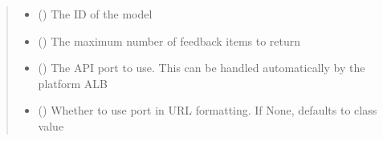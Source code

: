 \documentclass[letterpaper,10pt,english]{sphinxmanual}
\begin{document}
\begin{fulllineitems}
\begin{fulllineitems}
\begin{sphinxVerbatim}[commandchars=\\\{\}]
 
  
\end{sphinxVerbatim}
\begin{quote}\begin{description}
\begin{itemize}
\item {} 
\sphinxAtStartPar
{} () \textendash{} The ID of the model

\item {} 
\sphinxAtStartPar
{} (\sphinxstyleliteralemphasis{\sphinxupquote{ (}}\sphinxstyleliteralemphasis{\sphinxupquote{)}}) \textendash{} The maximum number of feedback items to return

\item {} 
\sphinxAtStartPar
{} (\sphinxstyleliteralemphasis{\sphinxupquote{ (}}\sphinxstyleliteralemphasis{\sphinxupquote{)}}) \textendash{} The API port to use. This can be handled automatically by the platform ALB

\item {} 
\sphinxAtStartPar
{} (\sphinxstyleliteralemphasis{\sphinxupquote{ (}}\sphinxstyleliteralemphasis{\sphinxupquote{)}}) \textendash{} Whether to use port in URL formatting. If None, defaults to class value

\end{itemize}


\end{description}
\end{quote}
\end{fulllineitems}
\end{fulllineitems}
\end{document}

